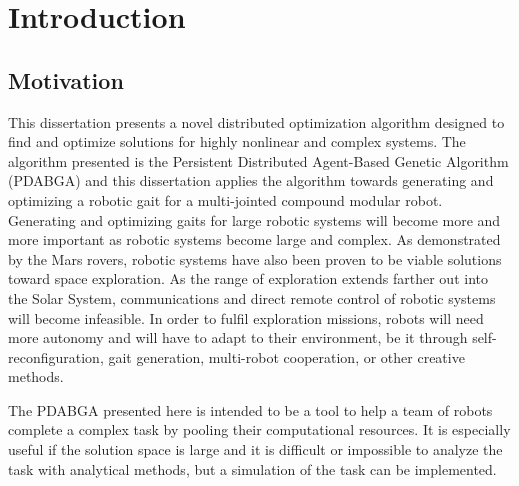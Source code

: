 



\chapter{Introduction} %
  \section{Motivation} %
    This dissertation presents a novel distributed optimization algorithm designed
      to find and optimize solutions for highly nonlinear and complex systems.
    The algorithm presented is the Persistent Distributed Agent-Based Genetic 
      Algorithm (PDABGA) and this dissertation applies the algorithm towards 
      generating and optimizing a robotic gait for a multi-jointed compound
      modular robot.        
    Generating and optimizing gaits for large robotic systems will become more
      and more important as robotic systems become large and complex. 
    As demonstrated by the Mars rovers, robotic systems have also been proven
      to be viable solutions toward space exploration.
    As the range of exploration extends farther out into the Solar System, 
      communications and direct remote control of robotic systems will become
      infeasible.
    In order to fulfil exploration missions, robots will need more autonomy and
      will have to adapt to their environment, be it through self-reconfiguration,
      gait generation, multi-robot cooperation, or other creative methods.

    The PDABGA presented here is intended to be a tool to help a team of robots
      complete a complex task by pooling their computational resources. 
    It is especially useful if the solution space is large and it is difficult
      or impossible to analyze the task with analytical methods, but a
      simulation of the task can be implemented.

